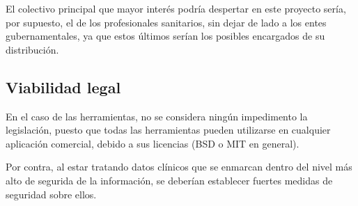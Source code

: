 El colectivo principal que mayor interés podría despertar en este proyecto sería, por supuesto, el de los profesionales sanitarios, sin dejar de lado a los entes gubernamentales, ya que estos últimos serían los posibles encargados de su distribución. 


\subsection{Viabilidad legal}

En el caso de las herramientas, no se considera ningún impedimento la legislación, puesto que todas las herramientas pueden utilizarse en cualquier aplicación comercial, debido a sus licencias (BSD o MIT en general).

Por contra, al estar tratando datos clínicos que se enmarcan dentro del nivel más alto de segurida de la información, se deberían establecer fuertes medidas de seguridad sobre ellos.